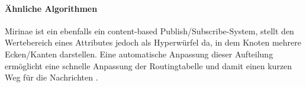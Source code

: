 \paragraph*{Ähnliche Algorithmen}
Mirinae ist ein ebenfalls ein content-based Publish/Subscribe-System, stellt den Wertebereich eines Attributes jedoch als Hyperwürfel da, in dem Knoten mehrere Ecken/Kanten darstellen. Eine automatische Anpassung dieser Aufteilung ermöglicht eine schnelle Anpassung der Routingtabelle und damit einen kurzen Weg für die Nachrichten \cite{Choi2005Mirinae}.
